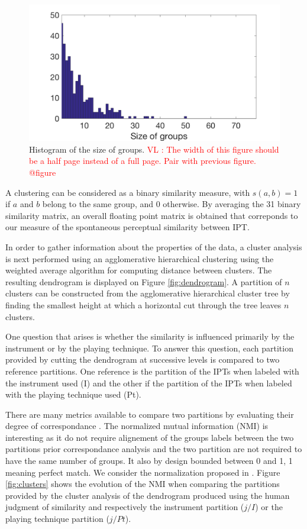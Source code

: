 \documentclass{article}
\newcommand{\ipt}{IPT\xspace}
\newcommand{\ipts}{IPTs\xspace}
\newcommand{\vl}[1]{\textcolor{red}{VL : #1}}
\begin{document}
\begin{figure}
\center
\includegraphics[width = \textwidth]{figures/sbc.png}
\caption{Histogram of the size of groups.
\vl{The width of this figure should be a half page instead of a full page. Pair with previous figure. @figure}}
\label{fig:xp2sizeGroup}
\end{figure}

A clustering can be considered as a binary similarity measure, with $s(a, b) = 1$ if $a$ and $b$ belong to the same group, and $0$ otherwise. By averaging the 31 binary similarity matrix, an overall floating point matrix is obtained that correponds to our measure of the spontaneous perceptual similarity between \ipt.

In order to gather information about the properties of the data, a cluster analysis is next performed using an agglomerative hierarchical clustering \cite{gordon1987review} using the weighted average algorithm for computing distance between clusters. The resulting dendrogram is displayed on Figure \ref{fig:dendrogram}. A partition of $n$ clusters can be constructed from the agglomerative hierarchical cluster tree by finding the smallest height at which a horizontal cut through the tree leaves $n$ clusters.

One question that arises is whether the similarity is influenced primarily by the instrument or by the playing technique. To answer this question, each partition provided by cutting the dendrogram at successive levels is compared to two reference partitions. One reference is the partition of the \ipts when labeled with the instrument used (I) and the other if the partition of the \ipts when labeled with the playing technique used (Pt).

There are many metrics available to compare two partitions by evaluating their degree of correspondance \cite{wagner2007comparing}. The normalized mutual information (NMI) is interesting as it do not require alignement of the groups labels between the two partitions prior correspondance analysis and the two partition are not required to have the same number of groups. It also by design bounded between 0 and 1, 1 meaning perfect match. We consider the normalization proposed in \cite{strehl2002cluster}. Figure \ref{fig:clusters} shows the evolution of the NMI when comparing the partitions provided by the cluster analysis of the dendrogram produced using the human judgment of similarity and respectively the instrument partition ($j/I$) or the playing technique partition ($j/Pt$).
\end{document}
